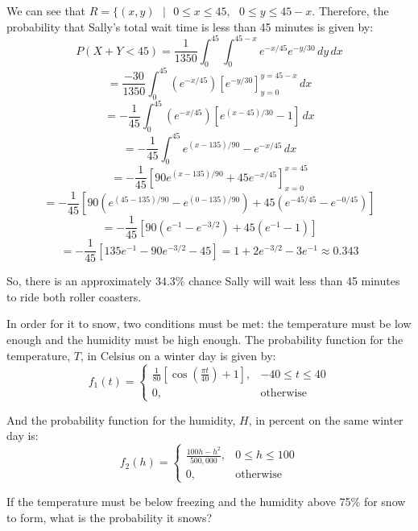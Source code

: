We can see that $R = \{(x, y)\text{ }|\text{ }0 \leq x \leq 45,\text{ }0 \leq 
y \leq 45 - x$. Therefore, the probability that Sally's total wait time is less
than 45 minutes is given by:
$$P(X + Y < 45) = \frac{1}{1350} \int_0^{45} \int_0^{45 - x} e^{-x/45} e^{-y/30
}\,dy\,dx$$
$$= \frac{-30}{1350} \int_0^{45} \left(e^{-x/45} \right) \left[e^{-y/30} 
\right]_{y = 0}^{y = 45 - x}\,dx$$
$$= -\frac{1}{45} \int_0^{45} \left( e^{-x/45} \right) \left[ e^{(x - 45)/30} 
- 1 \right]\,dx$$
$$= -\frac{1}{45} \int_0^{45} e^{(x - 135)/90} - e^{-x/45}\,dx$$
$$= -\frac{1}{45} \left[ 90e^{(x - 135)/90} + 45e^{-x/45} \right]_{x = 0}^{x = 
45}$$
$$= - \frac{1}{45} \left[ 90 \left( e^{(45 - 135)/90} - e^{(0 - 135)/90} 
\right) + 45 \left(e^{-45/45} - e^{-0/45} \right) \right]$$
$$= -\frac{1}{45} \left[90 \left( e^{-1} - e^{-3/2} \right) + 45 \left(e^{-1} 
- 1 \right) \right]$$
$$= -\frac{1}{45} \left[135e^{-1} - 90e^{-3/2} - 45 \right] = 1 + 2e^{-3/2} - 
3e^{-1} \approx 0.343$$

So, there is an approximately $34.3\%$ chance Sally will wait less than 45 
minutes to ride both roller coasters. 

\begin{Exercise}[title = {Snow Days}, label = snow]
In order for it to snow, two conditions must be met: the temperature must be 
low enough and the humidity must be high enough. The probability function for 
the temperature, $T$, in Celsius on a winter day is given by:
$$f_1(t) = 
\begin{cases}
    \frac{1}{80} \left[ \cos{\left( \frac{\pi t}{40} \right)} + 1 \right],& 
    -40 \leq t \leq 40\\
    0,&\text{otherwise}
\end{cases}
$$

And the probability function for the humidity, $H$, in percent on the same 
winter day is:
$$f_2(h) = 
\begin{cases}
    \frac{100h - h^2}{500,000},& 0 \leq h \leq 100\\
    0,&\text{otherwise}
\end{cases}
$$

If the temperature must be below freezing and the humidity above 75\% for snow 
to form, what is the probability it snows?
\end{Exercise}

